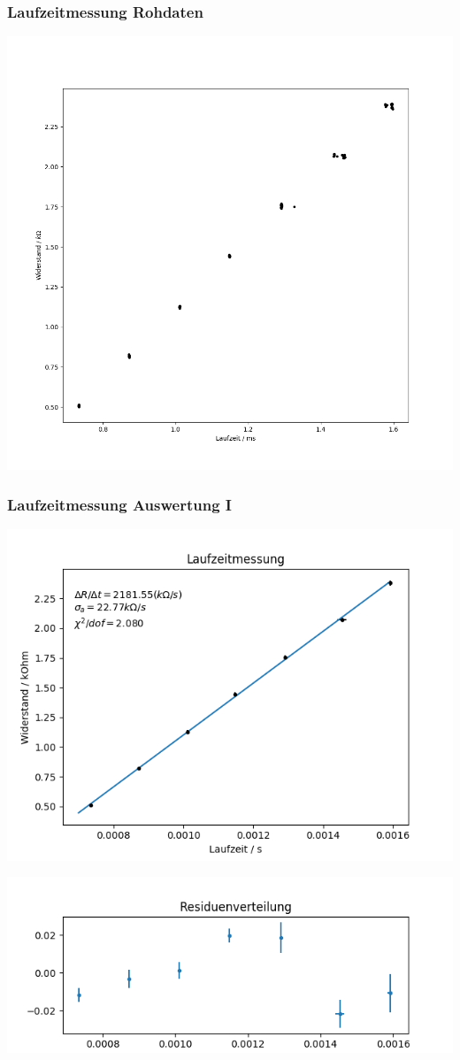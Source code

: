 \documentclass[12pt]{beamer}
\begin{document}
	\begin{frame}
		\frametitle{Laufzeitmessung \qquad Rohdaten}
		\begin{center}
			\includegraphics[width=0.75\linewidth]{rohdaten_laufzeit}
		\end{center}
	\end{frame}

	\begin{frame}
		\frametitle{Laufzeitmessung \qquad Auswertung I}
		\begin{center}
			\includegraphics[width=0.6\linewidth]{fit_laufzeit}
			
			\includegraphics[width=0.6\linewidth]{residuen_laufzeit}
		\end{center}
		
	\end{frame}
\end{document}
